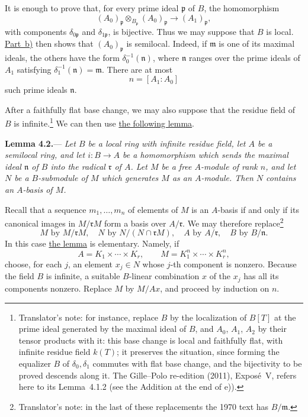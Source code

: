 

It is enough to prove that, for every prime ideal \(\mathfrak p\) of
\(B\), the homomorphism
\[
  (A_0)_{\mathfrak p}\otimes_{B_{\mathfrak p}}(A_0)_{\mathfrak p}
  \longrightarrow(A_1)_{\mathfrak p},
\]
with components \(\delta_{0\mathfrak p}\) and
\(\delta_{1\mathfrak p}\), is bijective. Thus we may suppose that
\(B\) is local. \hyperref[proof:sga3-V-4.1-b]{Part~b)} then shows that \((A_0)_{\mathfrak p}\) is
semilocal. Indeed, if \(\mathfrak m\) is one of its maximal ideals,
the others have the form \(\delta_0^{-1}(\mathfrak n)\), where
\(\mathfrak n\) ranges over the prime ideals of \(A_1\) satisfying
\(\delta_1^{-1}(\mathfrak n)=\mathfrak m\). There are at most
\[
  n=[A_1:A_0]
\]
such prime ideals \(\mathfrak n\).

After a faithfully flat base change, we may also suppose that the
residue field of \(B\) is infinite.\footnote{Translator's note: for instance, replace \(B\) by the localization of
\(B[T]\) at the prime ideal generated by the maximal ideal of \(B\), and
\(A_0\), \(A_1\), \(A_2\) by their tensor products with it: this base change is
local and faithfully flat, with infinite residue field \(k(T)\); it preserves
the situation, since forming the equalizer \(B\) of \(\delta_0,\delta_1\)
commutes with flat base change, and the bijectivity to be proved descends
along it. The Gille--Polo re-edition (2011), Exposé~V, refers here to its
Lemma~4.1.2 (see the Addition at the end of e)).}
We can then use \hyperref[lem:sga3-V-4.2]{the following lemma}.

\medskip
{}\label{lem:sga3-V-4.2}%
\noindent\textbf{Lemma 4.2.}---
\textit{Let \(B\) be a local ring with infinite residue field, let
\(A\) be a semilocal ring, and let \(i:B\to A\) be a homomorphism
which sends the maximal ideal \(\mathfrak n\) of \(B\) into the
radical \(\mathfrak r\) of \(A\). Let \(M\) be a free \(A\)-module of
rank \(n\), and let \(N\) be a \(B\)-submodule of \(M\) which
generates \(M\) as an \(A\)-module. Then \(N\) contains an
\(A\)-basis of \(M\).}

Recall that a sequence \(m_1,\ldots,m_n\) of elements of \(M\) is an
\(A\)-basis if and only if its canonical images in \(M/\mathfrak rM\)
form a basis over \(A/\mathfrak r\). We may therefore replace\footnote{Translator's note: in the last of these replacements the 1970 text has
\(B/\mathfrak m\).}
\[
  M\text{ by }M/\mathfrak rM,\quad
  N\text{ by }N/(N\cap\mathfrak rM),\quad
  A\text{ by }A/\mathfrak r,\quad
  B\text{ by }B/\mathfrak n.
\]
In this case \hyperref[lem:sga3-V-4.2]{the lemma} is elementary. Namely, if
\[
  A=K_1\times\cdots\times K_r,
  \qquad
  M=K_1^n\times\cdots\times K_r^n,
\]
choose, for each \(j\), an element \(x_j\in N\) whose \(j\)-th
component is nonzero. Because the field \(B\) is infinite, a suitable
\(B\)-linear combination \(x\) of the \(x_j\) has all its components
nonzero. Replace \(M\) by \(M/Ax\), and proceed by induction on \(n\).

